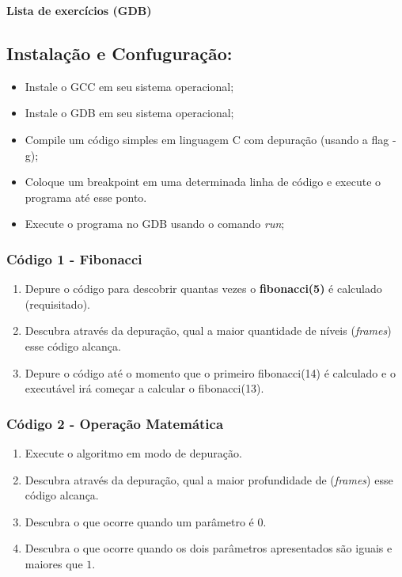 \documentclass[12pt]{article}
\begin{document}
\begin{center}
    \LARGE \textbf{Lista de exercícios (GDB)}
\end{center}

\subsection*{Instalação e Confuguração:}
\begin{itemize}
    \item Instale o GCC em seu sistema operacional;
    \item Instale o GDB em seu sistema operacional;
    \item Compile um código simples em linguagem C com depuração (usando a flag -g);
    \item Coloque um breakpoint em uma determinada linha de código e execute o programa até esse ponto.
    \item Execute o programa no GDB usando o comando \emph{run};
\end{itemize}

\subsubsection*{Código 1 - Fibonacci}

\begin{enumerate}[label=\alph*)]
    \item Depure o código para descobrir quantas vezes o \textbf{fibonacci(5)} é calculado (requisitado).
    \item Descubra através da depuração, qual a maior quantidade de níveis (\emph{frames}) esse código alcança.
    \item Depure o código até o momento que o primeiro fibonacci(14) é calculado e o executável irá começar a calcular o fibonacci(13).
\end{enumerate}

\newpage
\subsubsection*{Código 2 - Operação Matemática}

\begin{enumerate}[label=\alph*)]
    \item Execute o algoritmo em modo de depuração.
    \item Descubra através da depuração, qual a maior profundidade de (\emph{frames}) esse código alcança.
    \item Descubra o que ocorre quando um parâmetro é $0$.
    \item Descubra o que ocorre quando os dois parâmetros apresentados são iguais e maiores que $1$.
\end{enumerate}
\end{document}
